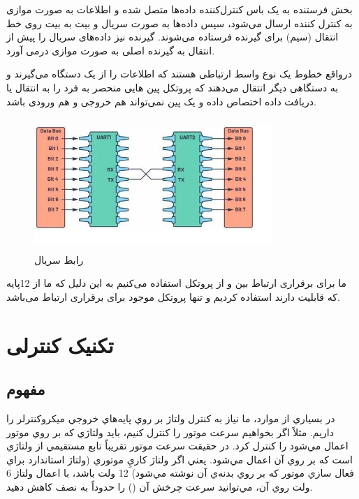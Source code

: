 بخش فرستنده  به یک باس کنترل‌کننده داده‌ها متصل شده و اطلاعات به صورت موازی به کنترل کننده ارسال می‌شود، سپس داده‌ها به صورت سریال و بیت به بیت روی خط انتقال (سیم) برای گیرنده  فرستاده می‌شوند. گیرنده  نیز داده‌های سریال را پیش از انتقال به گیرنده اصلی به صورت موازی درمی آورد.

\newpage
در‌واقع خطوط  یک نوع واسط ارتباطی هستند که اطلاعات را از یک دستگاه می‌گیرند و به دستگاهی دیگر انتقال می‌دهند که پروتکل  پین هایی منحصر به فرد را به انتقال یا دریافت داده اختصاص داده و یک پین نمی‌تواند هم خروجی و هم ورودی باشد.

    \begin{figure}[!h]
	\centering
	\includegraphics[height=5cm,width=9cm]{./Images/CH4/UART_2.jpg}
	\caption[رابط سریال ]{رابط سریال }
	\label{رابط سریال}
	\end{figure}

ما برای برقراری ارتباط بین  و  از پروتکل  استفاده می‌کنیم به این دلیل که ما از 12پایه که قابلیت  دارند استفاده کردیم و تنها پروتکل موجود برای برقراری ارتباط  می‌باشد.

\section{تکنیک کنترلی }
\subsection{مفهوم }
در بسياري از موارد، ما نياز به كنترل ولتاژ بر روي پايه‌هاي خروجي ميكروكنترلر را داريم. مثلاً اگر بخواهيم سرعت موتور را كنترل كنيم، بايد ولتاژي كه بر روي موتور اعمال مي‌شود را كنترل كرد. در حقيقت سرعت موتور تقريباً تابع مستقيمي از ولتاژي است كه بر روي آن اعمال مي‌شود. يعني اگر ولتاژ كاريِ موتوري (ولتاژ استاندارد براي فعال سازي موتور كه بر روي بدنه‌ي آن نوشته مي‌شود) 12 ولت باشد، با اعمال ولتاژ 6 ولت روي آن، مي‌توانيد سرعت چرخش آن () را حدوداً به نصف كاهش دهيد.

